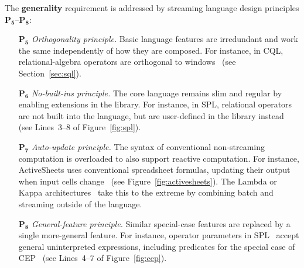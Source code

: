 The \textbf{generality} requirement is addressed by streaming language
design principles $\mathbf{P_5}$--$\mathbf{P_8}$:
\begin{itemize}[leftmargin=6mm]
  \item[$\mathbf{P_5}$] \emph{Orthogonality principle.} Basic language
    features are irredundant and work the same independently of how
    they are composed. For instance, in CQL, relational-algebra
    operators are orthogonal to windows~\cite{arasu_babu_widom_2006}
    (see Section~\ref{sec:sql}).
  \item[$\mathbf{P_6}$] \emph{No-built-ins principle.} The core language
    remains slim and regular by enabling extensions in the library. For
    instance, in SPL, relational operators are not built into the
    language, but are user-defined in the library
    instead~\cite{hirzel_schneider_gedik_2017} (see \mbox{Lines 3--8}
    of Figure~\ref{fig:spl}).
  \item[$\mathbf{P_7}$] \emph{Auto-update principle.} The syntax of
    conventional non-streaming computation is overloaded to also
    support reactive computation. For instance, ActiveSheets uses
    conventional spreadsheet formulas, updating their output when
    input cells change~\cite{vaziri_et_al_2014} (see
    Figure~\ref{fig:activesheets}).  The Lambda or Kappa
    architectures~\cite{kreps_2014} take this to the extreme by
    combining batch and streaming outside of the language.
  \item[$\mathbf{P_8}$] \emph{General-feature principle.} Similar
    special-case features are replaced by a single more-general
    feature. For instance, operator parameters in
    SPL~\cite{hirzel_schneider_gedik_2017} accept general
    uninterpreted expressions, including predicates for the special
    case of CEP~\cite{hirzel_2012} (see \mbox{Lines 4--7} of
    Figure~\ref{fig:cep}).
\end{itemize}

